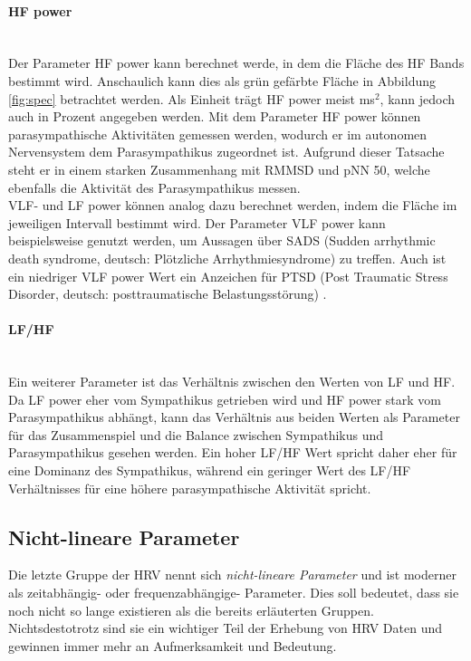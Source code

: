  \paragraph{HF power}\mbox{} \\
 Der Parameter HF power kann berechnet werde, in dem die Fläche des HF Bands bestimmt wird. Anschaulich kann dies als grün gefärbte Fläche in Abbildung \ref{fig:spec} betrachtet werden. Als Einheit trägt HF power meist ms$^{2}$, kann jedoch auch in Prozent angegeben werden. 
 Mit dem Parameter HF power können parasympathische Aktivitäten gemessen werden, wodurch er im autonomen Nervensystem dem Parasympathikus zugeordnet ist. Aufgrund dieser Tatsache steht er in einem starken Zusammenhang mit RMMSD und pNN 50, welche ebenfalls die Aktivität des Parasympathikus messen. \\
 VLF- und LF power können analog dazu berechnet werden, indem die Fläche im jeweiligen Intervall bestimmt wird. Der Parameter VLF power kann beispielsweise genutzt werden, um Aussagen über SADS (Sudden arrhythmic death syndrome, deutsch: Plötzliche Arrhythmiesyndrome) zu treffen. Auch ist ein niedriger VLF power Wert ein Anzeichen für PTSD (Post Traumatic Stress Disorder, deutsch: posttraumatische Belastungsstörung) . \cite[S.5]{med}\\
 
 
 \paragraph{LF/HF}\mbox{} \\
 Ein weiterer Parameter ist das Verhältnis zwischen den Werten von LF und HF. Da LF power eher vom Sympathikus getrieben wird und HF power stark vom Parasympathikus abhängt, kann das Verhältnis aus beiden Werten als Parameter für das Zusammenspiel und die Balance zwischen Sympathikus und Parasympathikus gesehen werden. Ein hoher LF/HF Wert spricht daher eher für eine Dominanz des Sympathikus, während ein geringer Wert des LF/HF Verhältnisses für eine höhere parasympathische Aktivität spricht. \cite[S.5]{med} 
 
 \subsection{Nicht-lineare Parameter}
 
 Die letzte Gruppe der HRV nennt sich \textit{nicht-lineare Parameter} und ist \glqq moderner\grqq{} als zeitabhängig- oder frequenzabhängige- Parameter. Dies soll bedeutet, dass sie noch nicht so lange existieren als die bereits erläuterten Gruppen. Nichtsdestotrotz sind sie ein wichtiger Teil der Erhebung von HRV Daten und gewinnen immer mehr an Aufmerksamkeit und Bedeutung.\\
 
